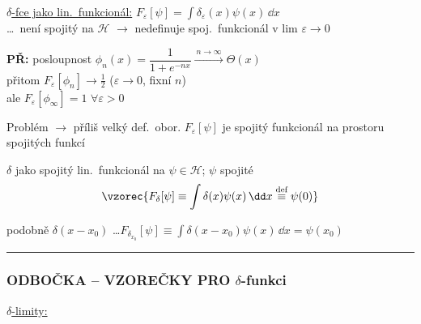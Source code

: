 \documentclass[11pt,a4paper]{article}
\begin{document}
\underline{$\delta$-fce jako lin.\ funkcionál:} \quad $F_\varepsilon[\psi] = \int\delta_\varepsilon(x)\psi(x)\,\dd x$ \\
\quad \dots\ není spojitý na $\mathcal{H}$ $\to$ nedefinuje spoj.\ funkcionál v lim $\varepsilon\to 0$

\begin{minipage}{0.65\textwidth}
\textbf{PŘ:} posloupnost \quad $\phi_n(x) = \dfrac{1}{1 + e^{-nx}} \xrightarrow{\ n\to\infty\ } \Theta(x)$ \\[3pt]
\quad přitom \quad $F_\varepsilon[\phi_n] \to \frac12$ \quad ($\varepsilon\to 0$, fixní $n$) \\
\quad ale \quad $F_\varepsilon[\phi_\infty] = 1$ \quad $\forall\varepsilon > 0$
\end{minipage}
\begin{minipage}{0.33\textwidth}
\end{minipage}

Problém $\to$ příliš velký def.\ obor. \quad $F_\varepsilon[\psi]$ je spojitý funkcionál na prostoru spojitých funkcí

\begin{definice}
$\delta$ jako spojitý lin.\ funkcionál na $\psi\in\mathcal{H}$; $\psi$ spojité
\[
  \vzorec{F_\delta[\psi] \equiv \int\delta(x)\psi(x)\,\dd x \overset{\text{def}}{\equiv} \psi(0)}
\]
\end{definice}
podobně \quad $\delta(x - x_0)$ \quad \dots \quad $F_{\delta_{x_0}}[\psi] \equiv \int\delta(x - x_0)\psi(x)\,\dd x = \psi(x_0)$

\noindent\rule{\linewidth}{0.4pt}
\subsubsection*{ODBOČKA -- VZOREČKY PRO $\delta$-funkci}

\underline{$\delta$-limity:}
\end{document}

